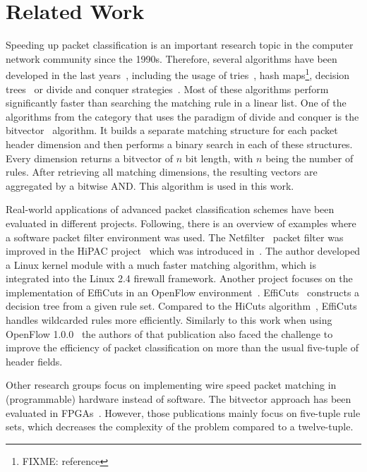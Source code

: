 \documentclass[conference]{IEEEtran}
\begin{document}
\section{Related Work}
Speeding up packet classification is an important research topic in the computer network community since the 1990s.
Therefore, several algorithms have been developed in the last 
years~\cite{algorithms_survey}, including the usage of tries~\cite{tries}, 
hash maps\footnote{FIXME: reference}, decision trees~\cite{hicuts, efficuts, hypercuts} or divide 
and conquer strategies~\cite{bv}.
Most of these algorithms perform significantly faster than searching the 
matching rule in a linear list.
One of the algorithms from the category that uses the paradigm of divide 
and conquer is the bitvector~\cite{bv} algorithm.
It builds a separate matching structure for each packet header dimension 
and then performs a binary search in each of these structures.
Every dimension returns a bitvector of $n$ bit length, with $n$ being the 
number of rules.
After retrieving all matching dimensions, the resulting vectors are aggregated by a bitwise AND.
This algorithm is used in this work.

Real-world applications of advanced packet classification schemes have been evaluated in different projects.
Following, there is an overview of examples where a software packet filter environment was used.
The Netfilter~\cite{netfilter} packet filter was improved in the HiPAC project~\cite{hipac} 
which was introduced in~\cite{heinzhigh}.
The author developed a Linux kernel module with a much faster matching algorithm, 
which is integrated into the Linux 2.4 firewall framework.
Another project focuses on the implementation of EffiCuts in an OpenFlow environment~\cite{stimpfling2013optimal}.
EffiCuts~\cite{efficuts} constructs a decision tree from a given rule set.
Compared to the HiCuts algorithm~\cite{hicuts}, EffiCuts handles wildcarded rules more efficiently.
Similarly to this work when using OpenFlow 1.0.0~\cite{openflow_spec10} 
the authors of that publication also faced the challenge to improve the efficiency 
of packet classification on more than the usual five-tuple of header fields.

Other research groups focus on implementing wire speed packet matching in (programmable) hardware instead of software.
The bitvector approach has been evaluated in FPGAs~\cite{bitvector_fpga, qu2013fast}.
However, those publications mainly focus on five-tuple rule sets, which decreases 
the complexity of the problem compared to a twelve-tuple.
\end{document}
